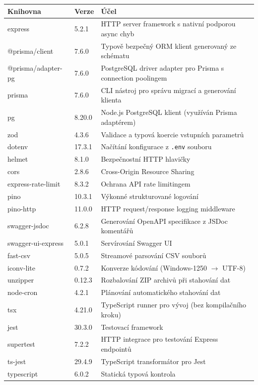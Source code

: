 \documentclass[12pt,a4paper]{article}
\begin{document}
\begin{longtable}{@{}llp{7cm}@{}}
\toprule
\textbf{Knihovna} & \textbf{Verze} & \textbf{Účel} \\
\midrule
\endhead
express & 5.2.1 & HTTP server framework s nativní podporou async chyb \\
@prisma/client & 7.6.0 & Typově bezpečný ORM klient generovaný ze schématu \\
@prisma/adapter-pg & 7.6.0 & PostgreSQL driver adapter pro Prisma s connection poolingem \\
prisma & 7.6.0 & CLI nástroj pro správu migrací a generování klienta \\
pg & 8.20.0 & Node.js PostgreSQL klient (využíván Prisma adaptérem) \\
zod & 4.3.6 & Validace a typová koercie vstupních parametrů \\
dotenv & 17.3.1 & Načítání konfigurace z \texttt{.env} souboru \\
helmet & 8.1.0 & Bezpečnostní HTTP hlavičky \\
cors & 2.8.6 & Cross-Origin Resource Sharing \\
express-rate-limit & 8.3.2 & Ochrana API rate limitingem \\
pino & 10.3.1 & Výkonné strukturované logování \\
pino-http & 11.0.0 & HTTP request/response logging middleware \\
swagger-jsdoc & 6.2.8 & Generování OpenAPI specifikace z JSDoc komentářů \\
swagger-ui-express & 5.0.1 & Servírování Swagger UI \\
fast-csv & 5.0.5 & Streamové parsování CSV souborů \\
iconv-lite & 0.7.2 & Konverze kódování (Windows-1250 \(\to\) UTF-8) \\
unzipper & 0.12.3 & Rozbalování ZIP archivů při stahování dat \\
node-cron & 4.2.1 & Plánování automatického stahování dat \\
tsx & 4.21.0 & TypeScript runner pro vývoj (bez kompilačního kroku) \\
jest & 30.3.0 & Testovací framework \\
supertest & 7.2.2 & HTTP integrace pro testování Express endpointů \\
ts-jest & 29.4.9 & TypeScript transformátor pro Jest \\
typescript & 6.0.2 & Statická typová kontrola \\
\bottomrule
\end{longtable}
\end{document}
